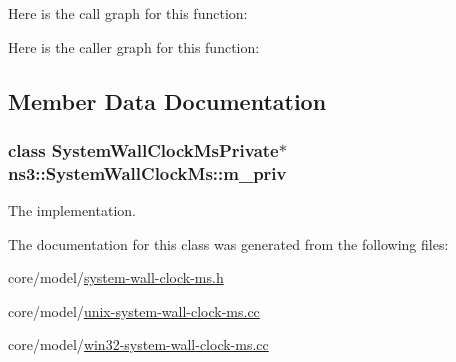 Here is the call graph for this function\+:




Here is the caller graph for this function\+:




\subsection{Member Data Documentation}
\subsubsection[{\texorpdfstring{m\+\_\+priv}{m_priv}}]{\setlength{\rightskip}{0pt plus 5cm}class {\bf System\+Wall\+Clock\+Ms\+Private}$\ast$ ns3\+::\+System\+Wall\+Clock\+Ms\+::m\+\_\+priv\hspace{0.3cm}{\ttfamily [private]}}\hypertarget{classns3_1_1SystemWallClockMs_a0a022abb3a76bfc57f07ff95f48d2a7b}{}\label{classns3_1_1SystemWallClockMs_a0a022abb3a76bfc57f07ff95f48d2a7b}


The implementation. 



The documentation for this class was generated from the following files\+:\begin{DoxyCompactItemize}
\item 
core/model/\hyperlink{system-wall-clock-ms_8h}{system-\/wall-\/clock-\/ms.\+h}\item 
core/model/\hyperlink{unix-system-wall-clock-ms_8cc}{unix-\/system-\/wall-\/clock-\/ms.\+cc}\item 
core/model/\hyperlink{win32-system-wall-clock-ms_8cc}{win32-\/system-\/wall-\/clock-\/ms.\+cc}\end{DoxyCompactItemize}
